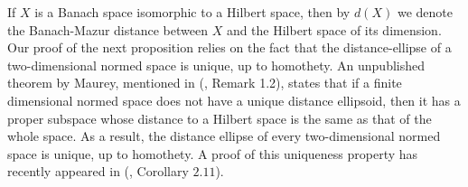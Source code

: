 \documentclass{article}[1100]
\theoremstyle{definition}
\theoremstyle{remark}
\begin{document}

If $X$ is a Banach space isomorphic to a Hilbert space, then  by $d(X)$ we denote the Banach-Mazur distance between $X$ and the
Hilbert space of its dimension. Our proof of the next proposition relies on the fact that the distance-ellipse of a two-dimensional
normed space is unique, up to homothety. An unpublished theorem by Maurey, mentioned in  (\cite{AFJS}, Remark 1.2), states that if a finite dimensional normed space does not have a unique distance ellipsoid, then it has a proper subspace whose distance to a Hilbert space is the same as that of the whole space. As a result, the distance ellipse of every two-dimensional normed space is unique, up to homothety.  A  proof of this uniqueness property has recently appeared in (\cite{GrundKobos}, Corollary $2.11$).
\end{document}
